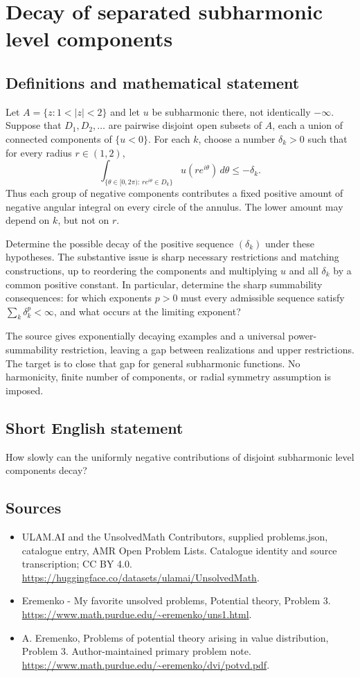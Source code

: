 \documentclass[11pt,a4paper]{article}
\begin{document}
\section*{Decay of separated subharmonic level components}\label{statement}

\subsection{Definitions and mathematical statement}
Let $A=\{z:1<|z|<2\}$ and let $u$ be subharmonic
there, not identically $-\infty$. Suppose that
$D_1,D_2,\ldots$ are pairwise disjoint open subsets of $A$,
each a union of connected components of $\{u<0\}$.
For each $k$, choose a number $\delta_k>0$ such that
for every radius $r\in(1,2)$,
\[
 \int_{\{\theta\in[0,2\pi):\,re^{i\theta}\in D_k\}}
                      u(re^{i\theta})\,d\theta
                         \leq-\delta_k.
\]
Thus each group of negative components contributes a fixed
positive amount of negative angular integral on every circle
of the annulus. The lower amount may depend on $k$, but
not on $r$.

Determine the possible decay of the positive sequence
$(\delta_k)$ under these hypotheses. The substantive issue
is sharp necessary restrictions and matching constructions,
up to reordering the components and multiplying $u$ and
all $\delta_k$ by a common positive constant.
In particular, determine the sharp summability consequences:
for which exponents $p>0$ must every admissible sequence
satisfy $\sum_k\delta_k^p<\infty$, and what occurs at the
limiting exponent?

The source gives exponentially decaying examples and a
universal power-summability restriction, leaving a gap
between realizations and upper restrictions. The target is
to close that gap for general subharmonic functions.
No harmonicity, finite number of components, or radial
symmetry assumption is imposed.
\subsection{Short English statement}
How slowly can the uniformly negative contributions of disjoint subharmonic level components decay?
\subsection{Sources}
\begin{itemize}
\item[S1] ULAM.AI and the UnsolvedMath Contributors, supplied problems.json, catalogue entry, AMR Open Problem Lists. Catalogue identity and source transcription; CC BY 4.0.
\url{https://huggingface.co/datasets/ulamai/UnsolvedMath}.
\item[S2] Eremenko - My favorite unsolved problems, Potential theory, Problem 3. 
\url{https://www.math.purdue.edu/~eremenko/uns1.html}.
\item[S3] A. Eremenko, Problems of potential theory arising in value distribution, Problem 3. Author-maintained primary problem note.
\url{https://www.math.purdue.edu/~eremenko/dvi/potvd.pdf}.
\end{itemize}
\end{document}
